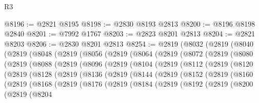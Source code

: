 \begin{lexlean}{R3}
\begin{coremodule}
@8196 := @2821 @8195
@8198 := @2830 @8193 @2813
@8200 := @8196 @8198 @2840
@8201 := @7992 @1767
@8203 := @2823 @8201 @2813
@8204 := @2821 @8203
@8206 := @2830 @8201 @2813
@8254 := @2819
    (@8032
      (@2819
        (@8040
          (@2819
            (@8048
              (@2819
                (@8056
                  (@2819
                    (@8064
                      (@2819
                        (@8072
                          (@2819
                            (@8080
                              (@2819
                                (@8088
                                  (@2819
                                    (@8096
                                      (@2819
                                        (@8104
                                          (@2819
                                            (@8112
                                              (@2819
                                                (@8120
                                                  (@2819
                                                    (@8128
                                                      (@2819
                                                        (@8136
                                                          (@2819
                                                            (@8144
                                                              (@2819
                                                                (@8152
                                                                  (@2819
                                                                    (@8160
                                                                      (@2819
                                                                        (@8168
                                                                          (@2819
                                                                            (@8176
                                                                              (@2819
                                                                                (@8184
                                                                                  (@2819
                                                                                    (@8192
                                                                                      (@2819
                                                                                        (@8200
                                                                                          (@2819
                                                                                            (@8204

\end{coremodule}
\end{lexlean}
